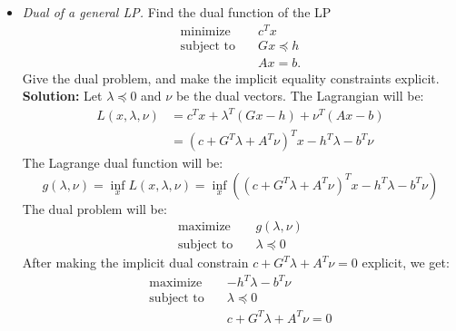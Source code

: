\documentclass{article}
\begin{document}
\begin{itemize}
  \item[5.5] \textit{Dual of a general LP.} Find the dual function of the LP
  \begin{align*}
    \text{minimize} \quad & c^T x \\
    \text{subject to} \quad & Gx \preceq h \\
    & Ax = b.
  \end{align*}
  Give the dual problem, and make the implicit equality constraints explicit. \\
  \textbf{Solution:} Let $\lambda \preceq 0$ and $\nu$ be the dual vectors. The Lagrangian will be:
  \begin{align*}
    L(x, \lambda, \nu) &= c^T x + \lambda^T (Gx - h) + \nu^T (Ax - b) \\
    &= (c + G^T \lambda + A^T \nu)^T x - h^T \lambda - b^T \nu
  \end{align*}
  The Lagrange dual function will be:
  \[ g(\lambda, \nu) = \inf_x L(x, \lambda, \nu) = \inf_x \left( (c + G^T \lambda + A^T \nu)^T x - h^T \lambda - b^T \nu \right) \]
  The dual problem will be:
  \begin{align*}
    \text{maximize} \quad & g(\lambda, \nu) \\
    \text{subject to} \quad & \lambda \preceq 0
  \end{align*}
  After making the implicit dual constrain $c + G^T \lambda + A^T \nu = 0$ explicit, we get:
   \begin{align*}
    \text{maximize} \quad & -h^T \lambda - b^T \nu \\
    \text{subject to} \quad & \lambda \preceq 0 \\
    & c + G^T \lambda + A^T \nu = 0
  \end{align*}


\end{itemize}
\end{document}
